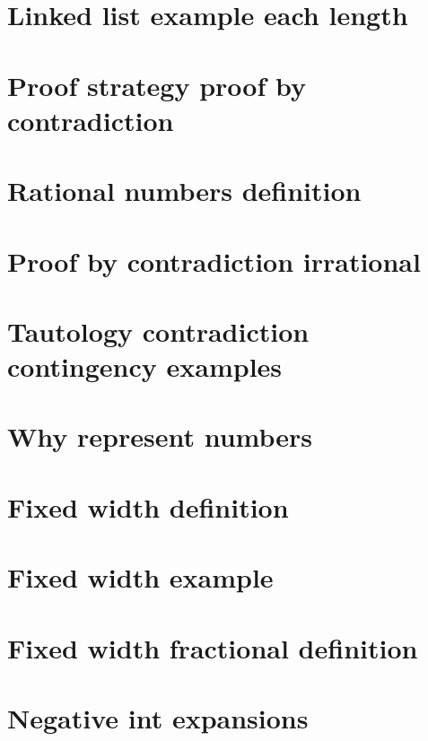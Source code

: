 \section*{Linked list example each length}

\vfill
\section*{Proof strategy proof by contradiction}

\vfill
\section*{Rational numbers definition}

\vfill
\section*{Proof by contradiction irrational}

\vfill
\section*{Tautology contradiction contingency examples}

\vfill
\section*{Why represent numbers}

\vfill
\section*{Fixed width definition}

\vfill
\section*{Fixed width example}

\vfill
\section*{Fixed width fractional definition}

\vfill
\section*{Negative int expansions}

\vfill

